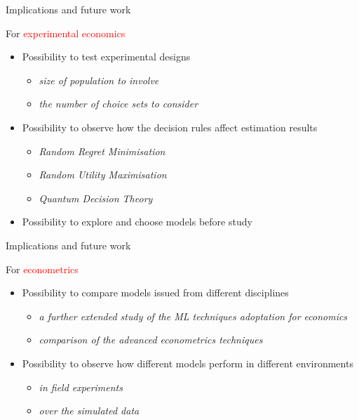 \documentclass[11pt,ignorenonframetext,]{beamer}
\providecommand{\tightlist}{%
  \setlength{\itemsep}{0pt}\setlength{\parskip}{0pt}}
\begin{document}
\begin{frame}{Implications and future work}
\protect\hypertarget{implications-and-future-work}{}

For \textcolor{red}{experimental economics}

\begin{itemize}
\tightlist
\item
  Possibility to test experimental designs

  \begin{itemize}
  \tightlist
  \item
    \emph{size of population to involve}
  \item
    \emph{the number of choice sets to consider}
  \end{itemize}
\item
  Possibility to observe how the decision rules affect estimation
  results

  \begin{itemize}
  \tightlist
  \item
    \emph{Random Regret Minimisation}
  \item
    \emph{Random Utility Maximisation}
  \item
    \emph{Quantum Decision Theory}
  \end{itemize}
\item
  Possibility to explore and choose models before study
\end{itemize}

\end{frame}

\begin{frame}{Implications and future work}
\protect\hypertarget{implications-and-future-work-1}{}

For \textcolor{red}{econometrics}

\begin{itemize}
\tightlist
\item
  Possibility to compare models issued from different disciplines

  \begin{itemize}
  \tightlist
  \item
    \emph{a further extended study of the ML techniques adoptation for
    economics}
  \item
    \emph{comparison of the advanced econometrics techniques}
  \end{itemize}
\item
  Possibility to observe how different models perform in different
  environments

  \begin{itemize}
  \tightlist
  \item
    \emph{in field experiments}
  \item
    \emph{over the simulated data}
  \end{itemize}
\end{itemize}

\end{frame}
\end{document}
